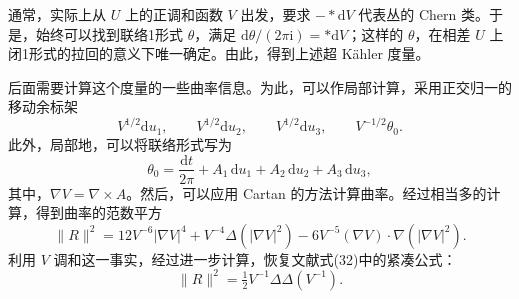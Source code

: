通常，实际上从 $U$ 上的正调和函数 $V$ 出发，要求 $-*\mathrm dV$ 代表丛的 Chern 类。于是，始终可以找到联络1形式 $\theta$，满足 $\mathrm d\theta/(2\pi\mathrm i)=*\mathrm dV$；这样的 $\theta$，在相差 $U$ 上闭1形式的拉回的意义下唯一确定。由此，得到上述超 Kähler 度量。

\begin{note}[numbered]\label{note:7.4}
后面需要计算这个度量的一些曲率信息。为此，可以作局部计算，采用正交归一的移动余标架
\[
V^{1/2}\mathrm du_1,\qquad V^{1/2}\mathrm du_2,\qquad
V^{1/2}\mathrm du_3,\qquad V^{-1/2}\theta_0.
\]
此外，局部地，可以将联络形式写为
\[
\theta_0=\frac{\mathrm dt}{2\pi}+A_1\,\mathrm du_1+A_2\,\mathrm du_2+A_3\,\mathrm du_3,
\]
其中，$\nabla V=\nabla\times A$。然后，可以应用 Cartan 的方法计算曲率。经过相当多的计算，得到曲率的范数平方
\[
\|R\|^2=12V^{-6}|\nabla V|^4+V^{-4}\Delta(|\nabla V|^2)
-6V^{-5}(\nabla V)\cdot\nabla(|\nabla V|^2).
\]
利用 $V$ 调和这一事实，经过进一步计算，恢复文献式(32)中的紧凑公式：
\[
\|R\|^2=\tfrac12V^{-1}\Delta\Delta(V^{-1}).
\]
\end{note}

